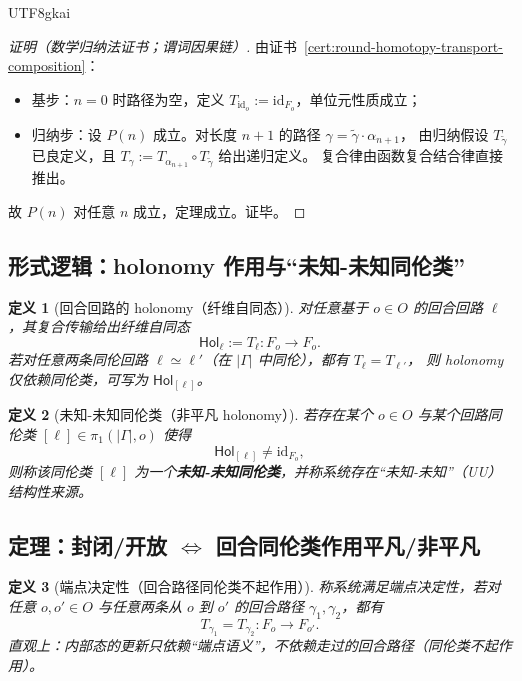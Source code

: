\documentclass[12pt]{article}
\newtheorem{definition}{定义}[section]
\begin{document}
\begin{CJK*}{UTF8}{gkai}
\begin{proof}[证明（数学归纳法证书；谓词因果链）]
由证书~\ref{cert:round-homotopy-transport-composition}：
\begin{itemize}
  \item 基步：$n=0$ 时路径为空，定义 $T_{\mathrm{id}_o}:=\mathrm{id}_{F_o}$，单位元性质成立；
  \item 归纳步：设 $P(n)$ 成立。对长度 $n+1$ 的路径 $\gamma=\widetilde\gamma\cdot\alpha_{n+1}$，
  由归纳假设 $T_{\widetilde\gamma}$ 已良定义，且 $T_{\gamma}:=T_{\alpha_{n+1}}\circ T_{\widetilde\gamma}$ 给出递归定义。
  复合律由函数复合结合律直接推出。
\end{itemize}
故 $P(n)$ 对任意 $n$ 成立，定理成立。证毕。
\end{proof}

\subsection{形式逻辑：holonomy 作用与“未知-未知同伦类”}
\label{sec:round-homotopy-holonomy-uu}

\begin{definition}[回合回路的 holonomy（纤维自同态）]
\label{def:round-homotopy-holonomy}
对任意基于 $o\in O$ 的回合回路 $\ell$，其复合传输给出纤维自同态
\[
  \mathsf{Hol}_{\ell}:=T_{\ell}:F_o\to F_o.
\]
若对任意两条同伦回路 $\ell\simeq \ell'$（在 $|\Gamma|$ 中同伦），都有 $T_{\ell}=T_{\ell'}$，
则 holonomy 仅依赖同伦类，可写为 $\mathsf{Hol}_{[\ell]}$。
\end{definition}

\begin{definition}[未知-未知同伦类（非平凡 holonomy）]
\label{def:round-homotopy-uu-class}
若存在某个 $o\in O$ 与某个回路同伦类 $[\ell]\in\pi_1(|\Gamma|,o)$ 使得
\[
  \mathsf{Hol}_{[\ell]}\neq \mathrm{id}_{F_o},
\]
则称该同伦类 $[\ell]$ 为一个\textbf{未知-未知同伦类}，并称系统存在“未知-未知”（UU）结构性来源。
\end{definition}

\subsection{定理：封闭/开放 $\Longleftrightarrow$ 回合同伦类作用平凡/非平凡}
\label{sec:round-homotopy-open-closed-theorem}

\begin{definition}[端点决定性（回合路径同伦类不起作用）]
\label{def:round-homotopy-endpoint-determined}
称系统满足端点决定性，若对任意 $o,o'\in O$ 与任意两条从 $o$ 到 $o'$ 的回合路径 $\gamma_1,\gamma_2$，都有
\[
  T_{\gamma_1}=T_{\gamma_2}:F_o\to F_{o'}.
\]
直观上：内部态的更新只依赖“端点语义”，不依赖走过的回合路径（同伦类不起作用）。
\end{definition}


\end{CJK*}
\end{document}
